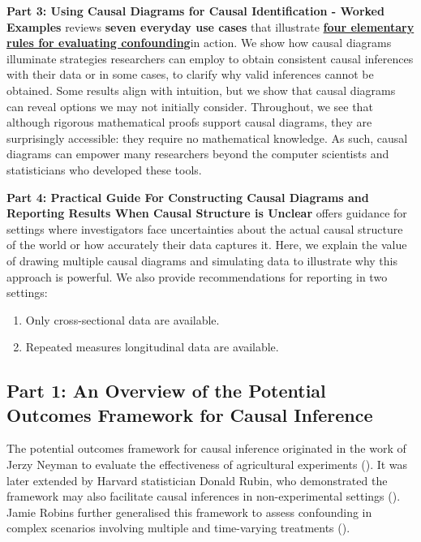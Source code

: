\documentclass[
  singlecolumn]{article}
\providecommand{\tightlist}{%
  \setlength{\itemsep}{0pt}\setlength{\parskip}{0pt}}\usepackage{longtable,booktabs,array}
\begin{document}
\textbf{Part 3: Using Causal Diagrams for Causal Identification - Worked
Examples} reviews \textbf{seven everyday use cases} that illustrate
\hyperref[sec-four-rules]{\textbf{four elementary rules for evaluating
confounding}}in action. We show how causal diagrams illuminate
strategies researchers can employ to obtain consistent causal inferences
with their data or in some cases, to clarify why valid inferences cannot
be obtained. Some results align with intuition, but we show that causal
diagrams can reveal options we may not initially consider. Throughout,
we see that although rigorous mathematical proofs support causal
diagrams, they are surprisingly accessible: they require no mathematical
knowledge. As such, causal diagrams can empower many researchers beyond
the computer scientists and statisticians who developed these tools.

\textbf{Part 4: Practical Guide For Constructing Causal Diagrams and
Reporting Results When Causal Structure is Unclear} offers guidance for
settings where investigators face uncertainties about the actual causal
structure of the world or how accurately their data captures it. Here,
we explain the value of drawing multiple causal diagrams and simulating
data to illustrate why this approach is powerful. We also provide
recommendations for reporting in two settings:

\begin{enumerate}
\def\labelenumi{(\roman{enumi})}
\tightlist
\item
  Only cross-sectional data are available.
\item
  Repeated measures longitudinal data are available.
\end{enumerate}

\subsection{Part 1: An Overview of the Potential Outcomes Framework for
Causal Inference}\label{section-part1}

The potential outcomes framework for causal inference originated in the
work of Jerzy Neyman to evaluate the effectiveness of agricultural
experiments (). It was later
extended by Harvard statistician Donald Rubin, who demonstrated the
framework may also facilitate causal inferences in non-experimental
settings (). Jamie Robins further
generalised this framework to assess confounding in complex scenarios
involving multiple and time-varying treatments
().
\end{document}
